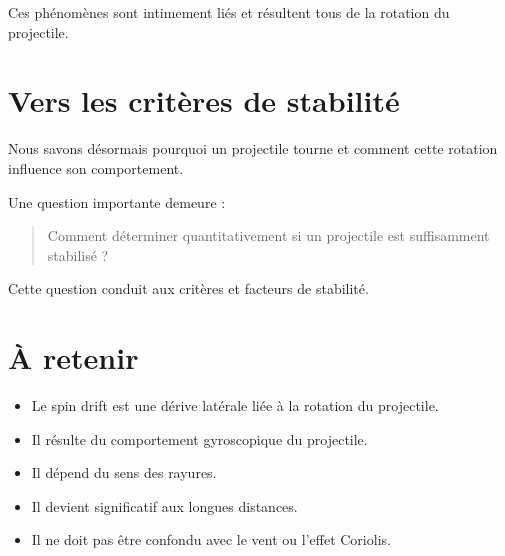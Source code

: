 Ces phénomènes sont intimement liés et résultent tous de la rotation du
projectile.

\section{Vers les critères de stabilité}

Nous savons désormais pourquoi un projectile tourne et comment cette rotation
influence son comportement.

Une question importante demeure :

\begin{quote}
Comment déterminer quantitativement si un projectile est suffisamment
stabilisé ?
\end{quote}

Cette question conduit aux critères et facteurs de stabilité.

\section{À retenir}

\begin{aretenir}

\begin{itemize}
    \item Le spin drift est une dérive latérale liée à la rotation du
          projectile.
    \item Il résulte du comportement gyroscopique du projectile.
    \item Il dépend du sens des rayures.
    \item Il devient significatif aux longues distances.
    \item Il ne doit pas être confondu avec le vent ou l'effet Coriolis.
\end{itemize}

\end{aretenir}
